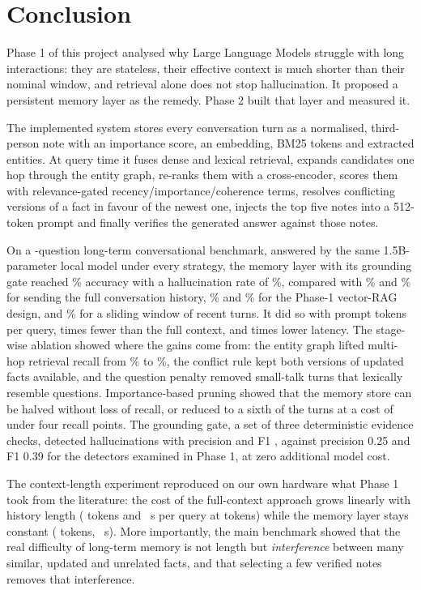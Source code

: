 
\section{Conclusion}
Phase 1 of this project analysed why Large Language Models struggle with long interactions: they are
stateless, their effective context is much shorter than their nominal window, and retrieval alone does
not stop hallucination. It proposed a persistent memory layer as the remedy. Phase 2 built that layer and
measured it.

The implemented system stores every conversation turn as a normalised, third-person note with an
importance score, an embedding, BM25 tokens and extracted entities. At query time it fuses dense and
lexical retrieval, expands candidates one hop through the entity graph, re-ranks them with a
cross-encoder, scores them with relevance-gated recency/importance/coherence terms, resolves conflicting
versions of a fact in favour of the newest one, injects the top five notes into a 512-token prompt and
finally verifies the generated answer against those notes.

On a \nQuestions-question long-term conversational benchmark, answered by the same 1.5B-parameter local
model under every strategy, the memory layer with its grounding gate reached \accMemGate\% accuracy with a
hallucination rate of \halMemGate\%, compared with \accFull\% and \halFull\% for sending the full
conversation history, \accRag\% and \halRag\% for the Phase-1 vector-RAG design, and \accWin\% for a
sliding window of recent turns. It did so with \tokMem{} prompt tokens per query, \tokRatioFullMem{} times
fewer than the full context, and \latRatioFullMem{} times lower latency. The stage-wise ablation showed
where the gains come from: the entity graph lifted multi-hop retrieval recall from \rFiveVecMH\% to
\rFiveMemMH\%, the conflict rule kept both versions of updated facts available, and the question penalty
removed small-talk turns that lexically resemble questions. Importance-based pruning showed that the memory
store can be halved without loss of recall, or reduced to a sixth of the turns at a cost of under four
recall points. The grounding gate, a set of
three deterministic evidence checks, detected hallucinations with precision \gatePMem{} and F1 \gateFMem,
against precision 0.25 and F1 0.39 for the detectors examined in Phase 1, at zero additional model cost.

The context-length experiment reproduced on our own hardware what Phase 1 took from the literature: the
cost of the full-context approach grows linearly with history length (\niahTokFullLast{} tokens and
\niahLatFullLast{}~s per query at \niahMaxLen{} tokens) while the memory layer stays constant
(\niahTokMemLast{} tokens, \niahLatMemLast{}~s). More importantly, the main benchmark showed that the real
difficulty of long-term memory is not length but \emph{interference} between many similar, updated and
unrelated facts, and that selecting a few verified notes removes that interference.

